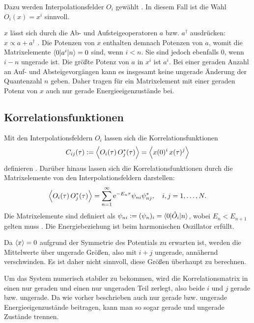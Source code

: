 Dazu werden Interpolationsfelder $O_i$ gewählt
\parencite[1]{Blossier/Eigenvalue}. In diesem Fall ist die Wahl $O_i(x) = x^i$
sinnvoll.

$x$ lässt sich durch die Ab- und Aufsteigeoperatoren $a$ bzw. $a^\dagger$
ausdrücken: $x \propto a + a^\dagger$
\parencite[(3.5a)]{Schwabl/Quantenmechanik}. Die Potenzen von $x$ enthalten
demnach Potenzen von $a$, womit die Matrixelemente $\braket{0|a^i|n} = 0$ sind,
wenn $i < n$. Sie sind jedoch ebenfalls 0, wenn $i - n$ ungerade ist. Die
größte Potenz von $a$ in $x^i$ ist $a^i$. Bei einer geraden Anzahl an Auf- und
Absteigevorgängen kann es insgesamt keine ungerade Änderung der Quantenzahl $n$
geben. Daher tragen für ein Matrixelement mit einer geraden Potenz von $x$ auch
nur gerade Energieeigenzustände bei.

\subsection{Korrelationsfunktionen}

Mit den Interpolationsfeldern $O_i$ lassen sich die Korrelationsfunktionen
\[
    C_{ij}(\tau) := \left\langle O_i(\tau) \, O_j^*(\tau) \right\rangle
    = \left\langle x(0)^i \, x(\tau)^j \right\rangle
\]
definieren \parencite[(2.1)]{Blossier/Eigenvalue}. Darüber hinaus lassen sich
die Korrelationsfunktionen durch die Matrixelemente von den
Interpolationsfeldern darstellen:
\[
    \left\langle O_i(\tau) \, O_j^*(\tau) \right\rangle
    = \sum_{n=1}^\infty \mathrm e^{-E_n \tau} \psi_{ni} \psi_{nj}^*
    ,\quad
    i, j = 1, \ldots, N.
\]
Die Matrixelemente sind definiert als $\psi_{ni} := (\psi_n)_i = \braket{0 |
\hat O_i | n}$, wobei $E_n < E_{n+1}$ gelten muss
\parencite[(2.1)]{Blossier/Eigenvalue}. Die Energiebeziehung ist beim
harmonischen Oszillator erfüllt.

Da $\langle x \rangle = 0$ aufgrund der Symmetrie des Potentials zu erwarten ist,
werden die Mittelwerte über ungerade Größen, also mit $i + j$ ungerade,
annähernd verschwinden. Es ist daher nicht sinnvoll, diese Größen überhaupt zu
berechnen.

Um das System numerisch stabiler zu bekommen, wird die Korrelationsmatrix in
einen nur geraden und einen nur ungeraden Teil zerlegt, also beide $i$ und $j$
gerade bzw. ungerade. Da wie vorher beschrieben auch nur gerade bzw. ungerade
Energieeigenzustände beitragen, kann man so sogar gerade und ungerade Zustände
trennen.

